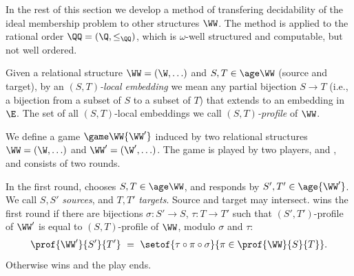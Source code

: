 In the rest of this section we develop a method of transfering decidability of the ideal membership
problem to other structures $\WW$.
The method is applied to the rational order $\QQ=(\Q, \leq_\QQ)$, which is 
$\omega$-well structured and computable, but not well ordered.


Given a relational structure $\WW = (\W, \ldots)$ and $S,T\in \age \WW$
(source and target),
by an \emph{$(S,T)$-local embedding} we mean any partial bijection $S\to T$ (i.e.,
a bijection from a subset of $S$ to a subset of $T$) 
that extends to an embedding in $\E$.
The set of all $(S,T)$-local embeddings we call \emph{$(S,T)$-profile} of $\WW$.

\smallskip

We define a game $\game \WW {\WW'}$ induced by
two relational structures $\WW = (\W,\ldots)$ and $\WW' = (\W', \ldots)$.
The game is played by two players, \Spoiler and \Reducer, and consists of two rounds.


In the first round, \Spoiler chooses $S,T\in\age \WW$,
and \Reducer responds by $S',T' \in \age{\WW'}$.
We call $S, S'$ \emph{sources}, and $T, T'$  \emph{targets}.
Source and target may intersect.
\Reducer wins the first round if there are bijections $\sigma : S'\to S$, $\tau : T\to T'$ 
such that
$(S',T')$-profile of $\WW'$ is equal to $(S,T)$-profile of $\WW$, 
modulo $\sigma$ and $\tau$:
%
\begin{align} \label{eq:win1}
\prof {\WW'} {S'} {T'} \ = \ 
\setof{\tau \circ \pi \circ \sigma}{\pi \in \prof {\WW} {S} {T}}.
\end{align}
%
Otherwise \Spoiler wins and the play ends.


